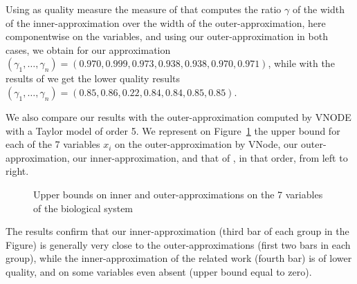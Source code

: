 \documentclass{sig-alternate-05-2015}
\begin{document}
Using as quality measure the measure of  \cite{Underapproxflowpipes} that computes the ratio $\gamma$ of the width of the inner-approximation over the width of the outer-approximation, 
here componentwise on the variables, and using our outer-approximation in both cases, we obtain for our approximation
$(\gamma_1,\ldots,\gamma_n)=(0.970,   0.999,   0.973,   0.938,   0.938,   0.970,   0.971)$, 
while with the results of \cite{underapprox16} we get the lower quality results
$(\gamma_1,\ldots,\gamma_n)=( 0.85,   0.86,   0.22,   0.84 ,  0.84 ,  0.85,   0.85)$.

We also compare our results with the outer-approximation computed by VNODE with a Taylor model of order 5. 
We represent on Figure~\ref{fig:histo} the upper bound for each of the 7 variables $x_i$ on the outer-approximation by VNode,  
our outer-approximation, our inner-approximation, and that of \cite{underapprox16}, in that order, from left to right.
\begin{figure}[htbp]
\begin{center}
\end{center}
\caption{Upper bounds on inner and outer-approximations on the 7 variables of the biological system \label{fig:histo}}
\end{figure}
The results confirm that our inner-approximation (third bar of each group in the Figure) is generally very close to the outer-approximations (first two bars in each group),
while the inner-approximation of the related work (fourth bar) is of lower quality, and on some variables even absent (upper bound equal to zero).




\end{document}
